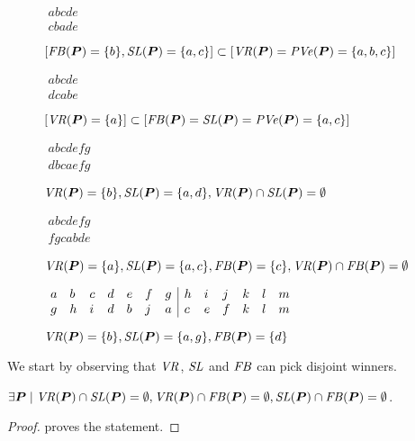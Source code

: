 \documentclass[version=3.21, pagesize, twoside=off, bibliography=totoc, DIV=calc, fontsize=12pt, a4paper]{scrartcl}
\begin{document}
\begin{figure}
	\caption{$[\mathit{FB}(\bm{P}) = \{b\}, \mathit{SL}(\bm{P}) = \{a, c\}] \subset [\mathit{VR}(\bm{P}) = \mathit{PVe}(\bm{P}) = \{a, b, c\}]$}
	\label{fig:cbade}
	$\begin{array}{l}
		abcde\\
		cbade
	\end{array}$
\end{figure}
\begin{figure}
	\caption{$[\mathit{VR}(\bm{P}) = \{a\}] \subset [\mathit{FB}(\bm{P}) = \mathit{SL}(\bm{P}) = \mathit{PVe}(\bm{P}) = \{a, c\}]$}
	\label{fig:dcabe}
	$\begin{array}{l}
		abcde\\
		dcabe
	\end{array}$
\end{figure}
\begin{figure}
	\caption{$\mathit{VR}(\bm{P}) = \{b\}, \mathit{SL}(\bm{P}) = \{a, d\}, \mathit{VR}(\bm{P}) \cap \mathit{SL}(\bm{P}) = \emptyset$}
	\label{fig:dbcaefg}
	$\begin{array}{l}
		abcdefg\\
		dbcaefg
	\end{array}$
\end{figure}
\begin{figure}
	\caption{$\mathit{VR}(\bm{P}) = \{a\}, \mathit{SL}(\bm{P}) = \{a, c\}, \mathit{FB}(\bm{P}) = \{c\}, \mathit{VR}(\bm{P}) \cap \mathit{FB}(\bm{P}) = \emptyset$}
	\label{fig:fgcabde}
	$\begin{array}{l}
		abcdefg\\
		fgcabde
	\end{array}$
\end{figure}
\begin{figure}
	\caption{$\mathit{VR}(\bm{P}) = \{b\}, \mathit{SL}(\bm{P}) = \{a, g\}, \mathit{FB}(\bm{P}) = \{d\}$}
	\label{fig:disjoint}
	$\begin{array}{llll lll | llll ll}
		a&b&c&d&e&f&g&h&i&j&k&l&m\\
		g&h&i&d&b&j&a&c&e&f&k&l&m\\
	\end{array}$
\end{figure}

We start by observing that $\mathit{VR}$, $\mathit{SL}$ and $\mathit{FB}$ can pick disjoint winners.
\begin{proposition}
	$\exists \prof \suchthat \VR(\prof) \cap \SL(\prof) = \emptyset, \VR(\prof) \cap \FB(\prof) = \emptyset, \SL(\prof) \cap \FB(\prof) = \emptyset$.
\end{proposition}
\begin{proof}
	 proves the statement.
\end{proof}
\end{document}
